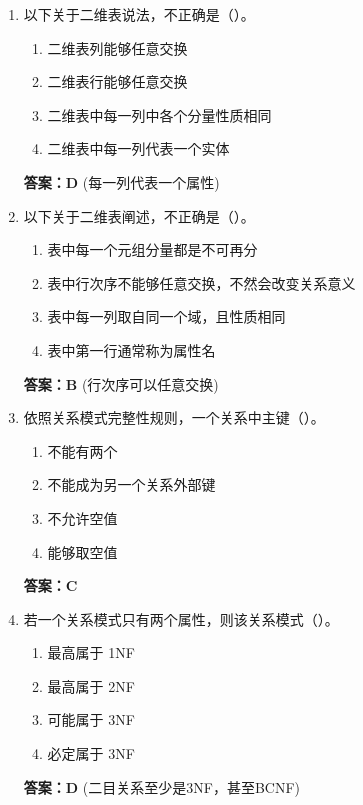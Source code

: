 \documentclass[12pt, a4paper]{article}
\begin{document}
\begin{enumerate}[label=\arabic*.]
    \item 以下关于二维表说法，不正确是（\quad）。
    \begin{enumerate}
        \item 二维表列能够任意交换
        \item 二维表行能够任意交换
        \item 二维表中每一列中各个分量性质相同
        \item 二维表中每一列代表一个实体
    \end{enumerate}
    \textbf{答案：D} (每一列代表一个属性)

    \item 以下关于二维表阐述，不正确是（\quad）。
    \begin{enumerate}
        \item 表中每一个元组分量都是不可再分
        \item 表中行次序不能够任意交换，不然会改变关系意义
        \item 表中每一列取自同一个域，且性质相同
        \item 表中第一行通常称为属性名
    \end{enumerate}
    \textbf{答案：B} (行次序可以任意交换)

    \item 依照关系模式完整性规则，一个关系中主键（\quad）。
    \begin{enumerate}
        \item 不能有两个
        \item 不能成为另一个关系外部键
        \item 不允许空值
        \item 能够取空值
    \end{enumerate}
    \textbf{答案：C}

    \item 若一个关系模式只有两个属性，则该关系模式（\quad）。
    \begin{enumerate}
        \item 最高属于 1NF
        \item 最高属于 2NF
        \item 可能属于 3NF
        \item 必定属于 3NF
    \end{enumerate}
    \textbf{答案：D} (二目关系至少是3NF，甚至BCNF)


\end{enumerate}
\end{document}
